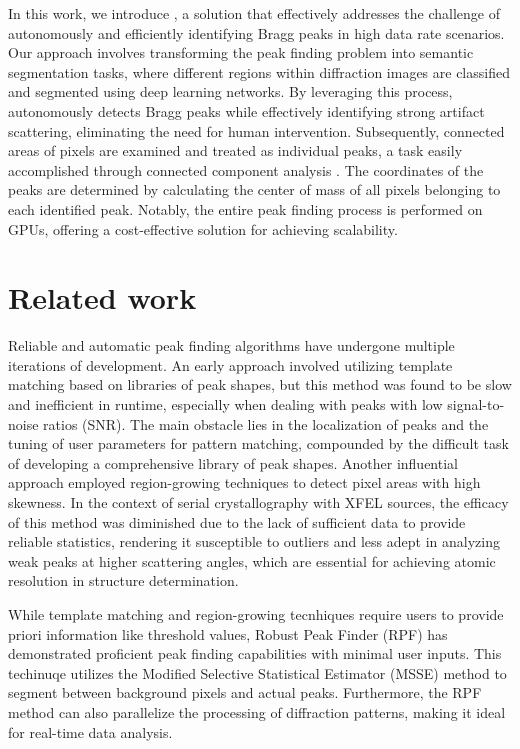 \documentclass[a4paper]{article}
\begin{document}
In this work, we introduce \peaknet{}, a solution that effectively addresses the
challenge of autonomously and efficiently identifying Bragg peaks in high data
rate scenarios.  Our approach involves transforming the peak finding problem into
semantic segmentation tasks, where different regions within diffraction images
are classified and segmented using deep learning networks.  By leveraging this
process, \peaknet{} autonomously detects Bragg peaks while effectively
identifying strong artifact scattering, eliminating the need for human
intervention.  Subsequently, connected areas of pixels are examined and treated
as individual peaks, a task easily accomplished through connected component
analysis \citep{weaverCentrosymmetricCrossSymmetricMatrices1985}.  The
coordinates of the peaks are determined by calculating the center of mass of all
pixels belonging to each identified peak.  Notably, the entire peak finding
process is performed on GPUs, offering a cost-effective solution for achieving
scalability.


\section{Related work}

Reliable and automatic peak finding algorithms have undergone multiple
iterations of development.  An early approach involved utilizing template
matching \citep{wilkinsonIntegrationSinglecrystalReflections1988a} based on
libraries of peak shapes, but this method was found to be slow and inefficient
in runtime, especially when dealing with peaks with low signal-to-noise ratios
(SNR).  The main obstacle lies in the localization of peaks and the tuning of
user parameters for pattern matching, compounded by the difficult task of
developing a comprehensive library of peak shapes.  Another influential approach
employed region-growing techniques
\citep{bolotovskySeedSkewnessMethodIntegration1995,
bartyCheetahSoftwareHighthroughput2014} to detect pixel areas with high
skewness.  In the context of serial crystallography with XFEL sources, the
efficacy of this method was diminished due to the lack of sufficient data to
provide reliable statistics, rendering it susceptible to outliers and less adept
in analyzing weak peaks at higher scattering angles, which are essential for
achieving atomic resolution in structure determination.

While template matching and region-growing tecnhiques require users to provide
priori information like threshold values, Robust Peak Finder (RPF)
\citep{hadian-jaziPeakfindingAlgorithmBased2017,
hadian-jaziDataReductionSerial2021} has demonstrated proficient peak finding
capabilities with minimal user inputs.  This techinuqe utilizes the Modified
Selective Statistical Estimator (MSSE) method to segment between background
pixels and actual peaks.  Furthermore, the RPF method can also parallelize the
processing of diffraction patterns, making it ideal for real-time data analysis.
\end{document}
